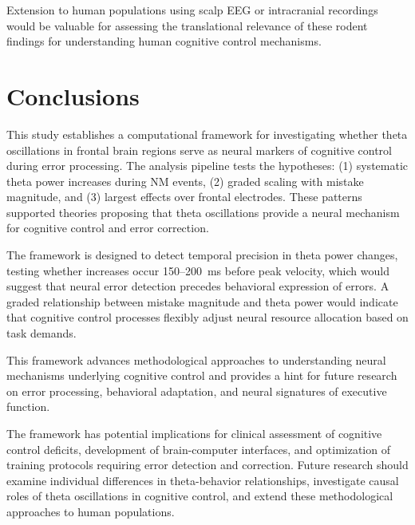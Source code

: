 \documentclass[11pt]{article}
\begin{document}
Extension to human populations using scalp EEG or intracranial recordings would be valuable for assessing the translational relevance of these rodent findings for understanding human cognitive control mechanisms.

\section{Conclusions}

This study establishes a computational framework for investigating whether theta oscillations in frontal brain regions serve as neural markers of cognitive control during error processing. The analysis pipeline tests the hypotheses: (1) systematic theta power increases during NM events, (2) graded scaling with mistake magnitude, and (3) largest effects over frontal electrodes. These patterns supported theories proposing that theta oscillations provide a neural mechanism for cognitive control and error correction.

The framework is designed to detect temporal precision in theta power changes, testing whether increases occur 150--200~ms before peak velocity, which would suggest that neural error detection precedes behavioral expression of errors. A graded relationship between mistake magnitude and theta power would indicate that cognitive control processes flexibly adjust neural resource allocation based on task demands.

This framework advances methodological approaches to understanding neural mechanisms underlying cognitive control and provides a hint for future research on error processing, behavioral adaptation, and neural signatures of executive function. 

The framework has potential implications for clinical assessment of cognitive control deficits, development of brain-computer interfaces, and optimization of training protocols requiring error detection and correction. Future research should examine individual differences in theta-behavior relationships, investigate causal roles of theta oscillations in cognitive control, and extend these methodological approaches to human populations.
\end{document}
